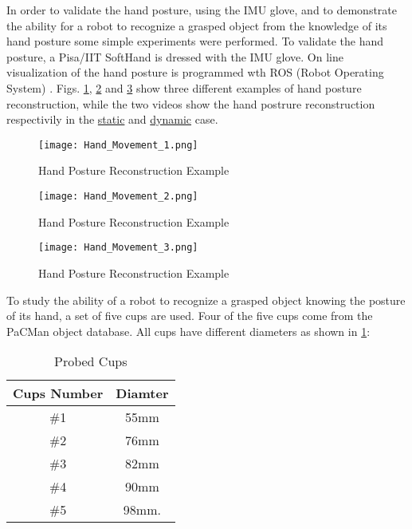 In order to validate the hand posture, using the IMU glove, and to demonstrate the ability for a robot to recognize a grasped object from the knowledge of its hand posture some simple experiments were performed.
To validate the hand posture, a Pisa/IIT SoftHand is dressed with the IMU glove. On line visualization of the hand posture is programmed wth ROS (Robot Operating System) \cite{Ros_homepage}. Figs. \ref{fig:hand_reconstruction_1}, \ref{fig:hand_reconstruction_2} and \ref{fig:hand_reconstruction_3} show three different examples of hand posture reconstruction, while the two videos show the hand postrure reconstruction respectivily in the \href{https://www.youtube.com/watch?v=0oVha0Q1vWM}{static} and \href{https://www.youtube.com/watch?v=bceOXa990-Q}{dynamic} case.

\begin{figure}[h]
\centering
\texttt{[image: Hand\_Movement\_1.png]}
\caption{Hand Posture Reconstruction Example}
\label{fig:hand_reconstruction_1}
\end{figure} 

\begin{figure}[h]
\centering
\texttt{[image: Hand\_Movement\_2.png]}
\caption{Hand Posture Reconstruction Example}
\label{fig:hand_reconstruction_2}
\end{figure} 

\begin{figure}[h]
\centering
\texttt{[image: Hand\_Movement\_3.png]}
\caption{Hand Posture Reconstruction Example}
\label{fig:hand_reconstruction_3}
\end{figure} 

To study the ability of a robot to recognize a grasped object knowing the posture of its hand, a set of five cups are used. Four of the five cups come from the PaCMan object database. All cups have different diameters as shown in \ref{tab:cups}:

\begin{table}[tb]\footnotesize
\begin{tabular}{cc} \hline \hline
Cups Number & Diamter \\ \hline
\#1 & 55mm \\
\#2 & 76mm \\
\#3 & 82mm \\
\#4 & 90mm \\
\#5 & 98mm.
\end{tabular}
\caption{Probed Cups}
\label{tab:cups}
\end{table}

